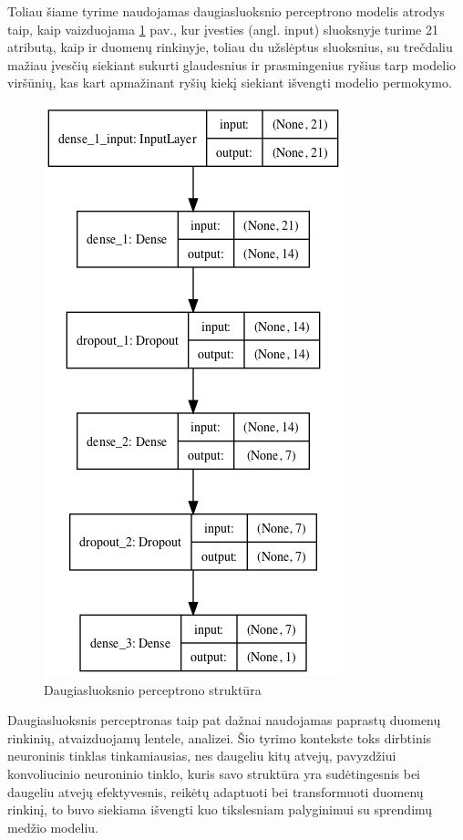 \documentclass{VUMIFPSbakalaurinis}
\begin{document}
Toliau šiame tyrime naudojamas daugiasluoksnio perceptrono modelis atrodys taip, kaip vaizduojama \ref{img:model} pav., kur įvesties (angl. input) sluoksnyje turime 21 atributą, kaip ir duomenų rinkinyje, toliau du užslėptus sluoksnius, su trečdaliu mažiau įvesčių siekiant sukurti glaudesnius ir prasmingenius ryšius tarp modelio viršūnių, kas kart apmažinant ryšių kiekį siekiant išvengti modelio permokymo.

\begin{figure}[H]
    \centering
    \includegraphics[scale=0.5]{img/model}
    \caption{Daugiasluoksnio perceptrono struktūra}
    \label{img:model}
\end{figure}

Daugiasluoksnis perceptronas taip pat dažnai naudojamas paprastų duomenų rinkinių, atvaizduojamų lentele, analizei. Šio tyrimo kontekste toks dirbtinis neuroninis tinklas tinkamiausias, nes daugeliu kitų atvejų, pavyzdžiui konvoliucinio neuroninio tinklo, kuris savo struktūra yra sudėtingesnis bei daugeliu atvejų efektyvesnis, reikėtų adaptuoti bei transformuoti duomenų rinkinį, to buvo siekiama išvengti kuo tikslesniam palyginimui su sprendimų medžio modeliu.
\end{document}
